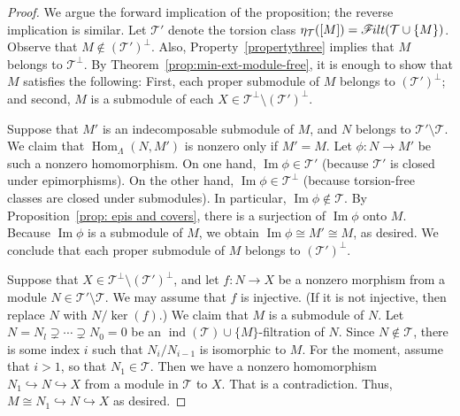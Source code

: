 \documentclass[10pt]{amsart}
\providecommand{\1}{}
\DeclareMathOperator{\image}{Im}
\DeclareMathOperator{\Hom}{Hom}
\DeclareMathOperator{\ind}{ind}
\newcommand{\calT}{\mathcal{T}}
\newcommand{\filt}{\mathscr{F}\Mk ilt}
\renewcommand{\1}{\hat{1}}
\newcommand{\0}{\hat{0}}
\newcommand*{\Mk}{\mkern -2mu}
\theoremstyle{definition}
\begin{document}
\begin{proof}
We argue the forward implication of the proposition; the reverse implication is similar. 
Let $\calT'$ denote the torsion class $\eta_\calT([M])=\filt(\calT \cup \{M\})$.
Observe that $M\not\in (\calT')^\perp$.
Also, Property~\ref{propertythree} implies that $M$ belongs to $\calT^\perp$.
By Theorem~\ref{prop:min-ext-module-free}, it is enough to show that $M$ satisfies the following:
First, each proper submodule of $M$ belongs to $(\calT')^\perp$; and second, $M$ is a submodule of each $X\in \calT^\perp \setminus (\calT')^\perp$.

Suppose that $M'$ is an indecomposable submodule of $M$, and $N$ belongs to $\calT'\setminus \calT$.
We claim that $\Hom_\Lambda(N, M')$ is nonzero only if $M'=M$.
Let $\phi: N\rightarrow M'$ be such a nonzero homomorphism.
On one hand, $\image \phi \in \calT'$ (because $\calT'$ is closed under epimorphisms).
On the other hand, $\image\phi \in \calT^\perp$ (because torsion-free classes are closed under submodules).
In particular, $\image\phi\not\in \calT$.
By Proposition~\ref{prop: epis and covers}, there is a surjection of $\image \phi$ onto $M$.
Because $\image\phi$ is a submodule of $M$, we obtain $\image\phi\cong M'\cong M$, as desired.
We conclude that each proper submodule of $M$ belongs to
$(\calT')^\perp$.

Suppose that $X\in \calT^\perp \setminus (\calT')^\perp$, and let $f: N\to X$ be a nonzero morphism from a module $N\in \calT'\setminus \calT$.
We may assume that $f$ is injective.
(If it is not injective, then replace $N$ with $N/\ker(f)$.)
We claim that $M$ is a submodule of $N$. 
Let $N=N_l \supsetneq \cdots
 \supsetneq N_0=0$ be an $\ind(\calT)\cup \{M\}$-filtration of $N$.
Since $N\notin \calT$, there is some index $i$ such that $N_i/N_{i-1}$ is isomorphic to $M$.
For the moment, assume that $i>1$, so that $N_1\in \calT$.
Then we have a nonzero homomorphism $N_1\hookrightarrow N \hookrightarrow X$ from a module in $\calT$ to $X$.
That is a contradiction.
Thus, $M\cong N_1 \hookrightarrow N \hookrightarrow X$ as desired.
\end{proof}
\end{document}
